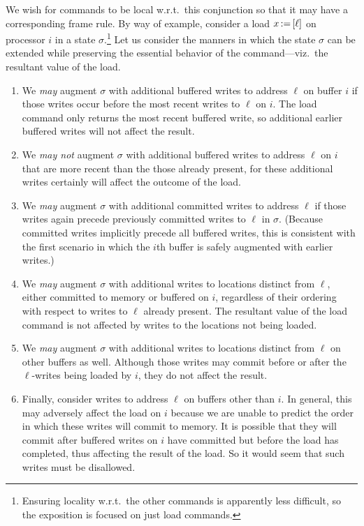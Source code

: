 \documentclass[11pt]{article}
\begin{document}
We wish for commands to be local w.r.t.~this conjunction so that it may have a corresponding frame rule. By way of example, consider a load $x \operatorname{:\!=} \left[ \ell \right]$ on processor $i$ in a state $\sigma$.\footnote{Ensuring locality w.r.t.~the other commands is apparently less difficult, so the exposition is focused on just load commands.} Let us consider the manners in which the state $\sigma$ can be extended while preserving the essential behavior of the command---viz.~the resultant value of the load. \begin{enumerate}
	\item We \emph{may} augment $\sigma$ with additional buffered writes to address $\ell$ on buffer $i$ if those writes occur before the most recent writes to $\ell$ on $i$. The load command only returns the most recent buffered write, so additional earlier buffered writes will not affect the result. 
	
	\item We \emph{may not} augment $\sigma$ with additional buffered writes to address $\ell$ on $i$ that are more recent than the those already present, for these additional writes certainly will affect the outcome of the load. 
	
	\item We \emph{may} augment $\sigma$ with additional committed writes to address $\ell$ if those writes again precede previously committed writes to $\ell$ in $\sigma$. (Because committed writes implicitly precede all buffered writes, this is consistent with the first scenario in which the $i$th buffer is safely augmented with earlier writes.)
	
	\item We \emph{may} augment $\sigma$ with additional writes to locations distinct from $\ell$, either committed to memory or buffered on $i$, regardless of their ordering with respect to writes to $\ell$ already present. The resultant value of the load command is not affected by writes to the locations not being loaded.  
	
	\item We \emph{may} augment $\sigma$ with additional writes to locations distinct from $\ell$ on other buffers as well. Although those writes may commit before or after the $\ell$-writes being loaded by $i$, they do not affect the result. 
	
	\item Finally, consider writes to address $\ell$ on buffers other than $i$. In general, this may adversely affect the load on $i$ because we are unable to predict the order in which these writes will commit to memory. It is possible that they will commit after buffered writes on $i$ have committed but before the load has completed, thus affecting the result of the load. So it would seem that such writes must be disallowed. 
	

\end{enumerate}
\end{document}
